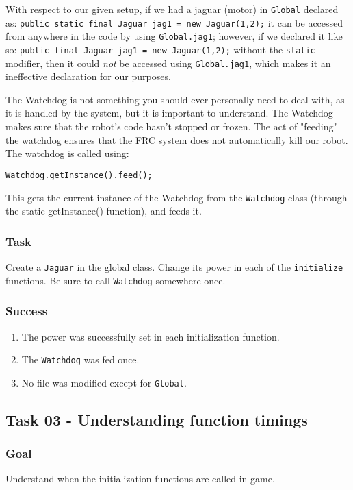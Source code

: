 \documentclass[a4paper]{article}
\begin{document}
With respect to our given setup, if we had a jaguar (motor) in \lstinline{Global} declared as: \lstinline{public static final Jaguar jag1 = new Jaguar(1,2);} it can be accessed from anywhere in the code by using \lstinline{Global.jag1}; however, if we declared it like so: \lstinline{public final Jaguar jag1 = new Jaguar(1,2);} without the \lstinline{static} modifier, then it could \textit{not} be accessed using \lstinline{Global.jag1}, which makes it an ineffective declaration for our purposes.

The Watchdog is not something you should ever personally need to deal with, as it is handled by the system, but it is important to understand. The Watchdog makes sure that the robot's code hasn't stopped or frozen. The act of "feeding" the watchdog ensures that the FRC system does not automatically kill our robot. The watchdog is called using:

\lstinline{Watchdog.getInstance().feed();}

This gets the current instance of the Watchdog from the \lstinline{Watchdog} class (through the static getInstance() function), and feeds it.
\subsubsection{Task} Create a \lstinline{Jaguar} in the global class. Change its power in each of the \lstinline{initialize} functions. Be sure to call \lstinline{Watchdog} somewhere once.
\subsubsection{Success} \begin{enumerate}\item{The power was successfully set in each initialization function.}\item{The \lstinline{Watchdog} was fed once.}\item{No file was modified except for \lstinline{Global}.}\end{enumerate}

\subsection{Task 03 - Understanding function timings}
\subsubsection{Goal} Understand when the initialization functions are called in game.
\end{document}
